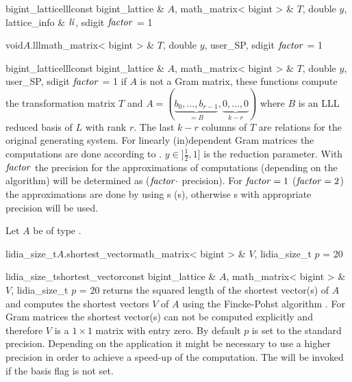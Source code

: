 \begin{fcode}{bigint_lattice}{lll}{const bigint_lattice & $A$, math_matrix< bigint > & $T$,
    double $y$, lattice_info & $\mathit{li}$, sdigit $\mathit{factor}$ = 1}%
\end{fcode}

\begin{fcode}{void}{$A$.lll}{math_matrix< bigint > & $T$, double $y$, user_SP,
    sdigit $\mathit{factor}$ = 1}%
\end{fcode}

\begin{fcode}{bigint_lattice}{lll}{const bigint_lattice & $A$, math_matrix< bigint > & $T$,
    double $y$, user_SP, sdigit $\mathit{factor}$ = 1}%
  if $A$ is not a Gram matrix, these functions compute the transformation matrix $T$ and $A =
  (\underbrace{b_0, \dots, b_{r-1}}_{=B}, \underbrace{0, \dots , 0}_{k-r})$ where $B$ is an LLL
  reduced basis of $L$ with rank $r$.  The last $k-r$ columns of $T$ are relations for the
  original generating system.  For linearly (in)dependent Gram matrices the computations are
  done according to \cite{Cohen:1995}.  $y\in ]\frac{1}{2},1]$ is the reduction parameter.  With
  $\mathit{factor}$ the precision for the approximations of computations (depending on the algorithm)
  will be determined as ($\mathit{factor} \cdot$  precision).  For $\mathit{factor} = 1$ ($\mathit{factor}
  = 2$) the approximations are done by using s (s), otherwise
  s with appropriate precision will be used.
\end{fcode}




Let $A$ be of type .

\begin{fcode}{lidia_size_t}{$A$.shortest_vector}{math_matrix< bigint > & $V$, lidia_size_t $p$ = 20}
\end{fcode}

\begin{fcode}{lidia_size_t}{shortest_vector}{const bigint_lattice & $A$,
    math_matrix< bigint > & $V$, lidia_size_t $p$ = 20}%
  returns the squared length of the shortest vector(s) of $A$ and computes the shortest vectors
  $V$ of $A$ using the Fincke-Pohst algorithm \cite{Fincke/Pohst:1985}.  For Gram matrices the
  shortest vector(s) can not be computed explicitly and therefore $V$ is a $1 \times 1$ matrix
  with entry zero.  By default $p$ is set to the standard  precision.  Depending
  on the application it might be necessary to use a higher precision in order to achieve a
  speed-up of the computation.  The \LEH will be invoked if the basis flag is not set.
\end{fcode}


